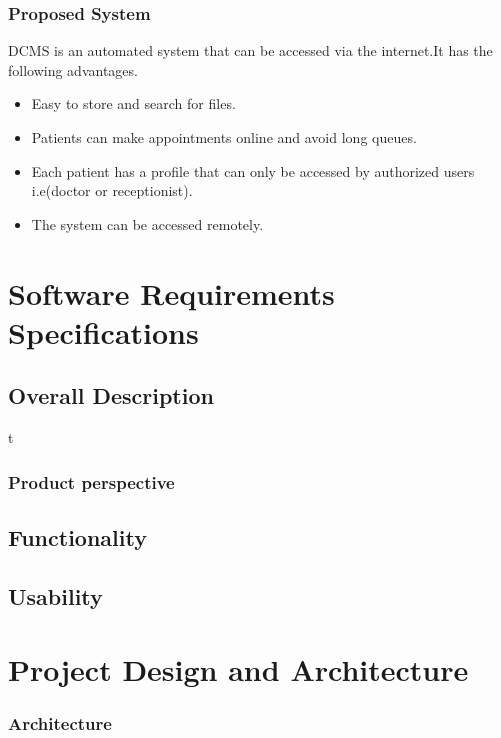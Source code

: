 \documentclass[11 pt]{article}
\begin{document}
\subsubsection{Proposed System}
DCMS is an automated system that can be accessed via the internet.It has the following advantages.
\begin{itemize}
\item
 Easy to store and search for files.
 \item
 Patients can make appointments online and avoid long queues.
 \item
 Each patient has a profile that can only be accessed by authorized users i.e(doctor or receptionist).
 \item
 The system can be accessed remotely.
 


\end{itemize}

\section{Software Requirements Specifications}
\subsection{Overall Description}t
\subsubsection{Product perspective}

\subsection{Functionality}
\subsection{Usability}
\newpage   
\section{Project Design and Architecture}
 
    \subsubsection{Architecture}
    
\end{document}
